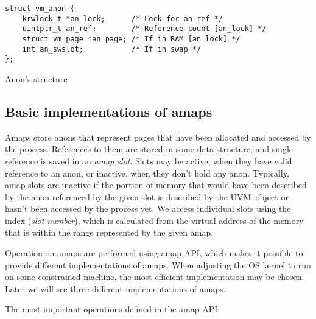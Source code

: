 \begin{listing}[h]
  \begin{verbatim}
struct vm_anon {
    krwlock_t *an_lock;      /* Lock for an_ref */
    uintptr_t an_ref;        /* Reference count [an_lock] */
    struct vm_page *an_page; /* If in RAM [an_lock] */
    int an_swslot;           /* If in swap */
};
  \end{verbatim}
  \caption{Anon's structure}
  \label{code:vm_anon}
\end{listing}

\subsection{Basic implementations of amaps}

Amaps store anons that represent pages that have been allocated and accessed by the process.
References to them are stored in some data structure, and single reference is saved in an {\it amap slot}\footnotemark.
Slots may be active, when they have valid reference to an anon, or inactive, when they don't hold any anon.
Typically, amap slots are inactive if the portion of memory that would have been described by the anon referenced by the given slot
is described by the UVM~object or hasn't been accessed by the process yet.
We access individual slots using the index ({\it slot number}),
which is calculated from the virtual address of the memory that is within the range represented by the given amap.

Operation on amaps are performed using amap API, which makes it possible to provide different implementations of amaps.
When adjusting the OS kernel to run on some constrained machine, the most efficient implementation may be chosen.
Later we will see three different implementations of amaps.

The most important operations defined in the amap API:

